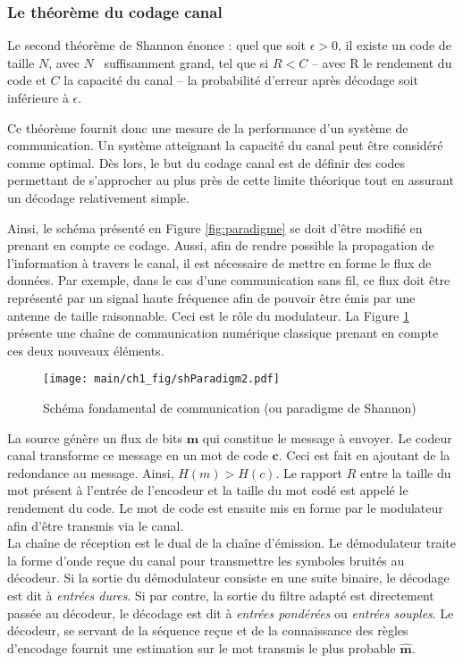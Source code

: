 \subsubsection{Le théorème du codage canal}
Le second théorème de Shannon énonce : quel que soit $\epsilon > 0$, il existe un code de taille $N$, avec $N$ \
suffisamment grand, tel que si $R<C$ -- avec R le rendement du code et $C$ la capacité du canal -- la probabilité
d'erreur après décodage soit inférieure à $\epsilon$. 

Ce théorème fournit donc une mesure de la performance d'un système de communication. Un système atteignant la capacité 
du canal peut être considéré comme optimal. Dès lors, le but du codage canal est de définir des codes permettant de 
s'approcher au plus près de cette limite théorique tout en assurant un décodage relativement simple.

Ainsi, le schéma présenté en Figure \ref{fig:paradigme} se doit d'être modifié en prenant en compte ce codage. Aussi,
afin de rendre possible la propagation de l'information à travers le canal, il est nécessaire de mettre en forme le flux 
de données. Par exemple, dans le cas d'une communication sans fil, ce flux doit être représenté par un signal haute 
fréquence afin de pouvoir être émis par une antenne de taille raisonnable. Ceci est le rôle du modulateur.
La Figure \ref{fig:paradigme2} présente une chaîne de communication numérique classique prenant en compte ces deux
nouveaux éléments.
\begin{figure}[!h]
	\centering
	\texttt{[image: main/ch1\_fig/shParadigm2.pdf]}
	\caption{\label{fig:paradigme2} Schéma fondamental de communication (ou paradigme de Shannon)}
\end{figure}

La source génère un flux de bits $\mathbf{m}$ qui constitue le message à envoyer. Le codeur canal transforme ce message 
en un mot de code $\mathbf{c}$. Ceci est fait en ajoutant de la redondance au message. Ainsi, $H(m)>H(c)$. Le rapport $R$
entre la taille du mot présent à l'entrée de l'encodeur et la taille du mot codé est appelé le rendement du code. Le mot 
de code est ensuite mis en forme par le modulateur afin d'être transmis via le canal.\\
La chaîne de réception est le dual de la chaîne d’émission. Le démodulateur traite la forme d'onde reçue du canal 
pour transmettre les symboles bruités au décodeur. Si la sortie du démodulateur consiste en une suite binaire, le 
décodage est dit à \emph{entrées dures}. Si par contre, la sortie du filtre adapté est directement passée au décodeur, 
le décodage est dit à \emph{entrées pondérées} ou \emph{entrées souples}. Le décodeur, se servant de la séquence reçue et de la connaissance des règles 
d'encodage fournit une estimation sur le  mot transmis le plus probable $\mathbf{\hat{m}}$.


